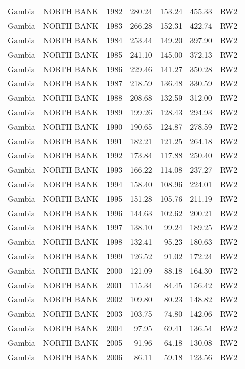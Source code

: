 \begin{longtable}{lllrrrl}
  Gambia & NORTH BANK & 1982 & 280.24 & 153.24 & 455.33 & RW2 \\ 
  Gambia & NORTH BANK & 1983 & 266.28 & 152.31 & 422.74 & RW2 \\ 
  Gambia & NORTH BANK & 1984 & 253.44 & 149.20 & 397.90 & RW2 \\ 
  Gambia & NORTH BANK & 1985 & 241.10 & 145.00 & 372.13 & RW2 \\ 
  Gambia & NORTH BANK & 1986 & 229.46 & 141.27 & 350.28 & RW2 \\ 
  Gambia & NORTH BANK & 1987 & 218.59 & 136.48 & 330.59 & RW2 \\ 
  Gambia & NORTH BANK & 1988 & 208.68 & 132.59 & 312.00 & RW2 \\ 
  Gambia & NORTH BANK & 1989 & 199.26 & 128.43 & 294.93 & RW2 \\ 
  Gambia & NORTH BANK & 1990 & 190.65 & 124.87 & 278.59 & RW2 \\ 
  Gambia & NORTH BANK & 1991 & 182.21 & 121.25 & 264.18 & RW2 \\ 
  Gambia & NORTH BANK & 1992 & 173.84 & 117.88 & 250.40 & RW2 \\ 
  Gambia & NORTH BANK & 1993 & 166.22 & 114.08 & 237.27 & RW2 \\ 
  Gambia & NORTH BANK & 1994 & 158.40 & 108.96 & 224.01 & RW2 \\ 
  Gambia & NORTH BANK & 1995 & 151.28 & 105.76 & 211.19 & RW2 \\ 
  Gambia & NORTH BANK & 1996 & 144.63 & 102.62 & 200.21 & RW2 \\ 
  Gambia & NORTH BANK & 1997 & 138.10 & 99.24 & 189.25 & RW2 \\ 
  Gambia & NORTH BANK & 1998 & 132.41 & 95.23 & 180.63 & RW2 \\ 
  Gambia & NORTH BANK & 1999 & 126.52 & 91.02 & 172.24 & RW2 \\ 
  Gambia & NORTH BANK & 2000 & 121.09 & 88.18 & 164.30 & RW2 \\ 
  Gambia & NORTH BANK & 2001 & 115.34 & 84.45 & 156.42 & RW2 \\ 
  Gambia & NORTH BANK & 2002 & 109.80 & 80.23 & 148.82 & RW2 \\ 
  Gambia & NORTH BANK & 2003 & 103.75 & 74.80 & 142.06 & RW2 \\ 
  Gambia & NORTH BANK & 2004 & 97.95 & 69.41 & 136.54 & RW2 \\ 
  Gambia & NORTH BANK & 2005 & 91.96 & 64.18 & 130.08 & RW2 \\ 
  Gambia & NORTH BANK & 2006 & 86.11 & 59.18 & 123.56 & RW2 \\ 

\end{longtable}
